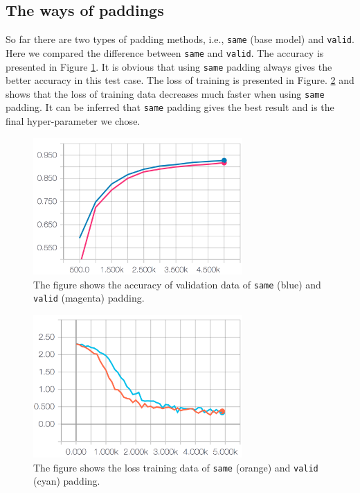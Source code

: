 \documentclass[11pt]{article}
\begin{document}
\clearpage
\subsection{The ways of paddings}
So far there are two types of padding methods, i.e., {\tt same} (base model) and {\tt valid}. Here we compared the difference between {\tt same} and {\tt valid}. The accuracy is presented in Figure \ref{fig:padding}. It is obvious that using {\tt same} padding always gives the better accuracy in this test case. The loss of training is presented in Figure. \ref{fig:padding_loss} and shows that the loss of training data decreases much faster when using {\tt same} padding. It can be inferred that {\tt same} padding gives the best result and is the final hyper-parameter we chose.


\begin{figure}[!htb]
   \centering
   \includegraphics[width=8cm]{images/padding_accuracy.png} %
   \caption{The figure shows the accuracy of validation data of {\tt same} (blue) and {\tt valid} (magenta) padding. }
   \label{fig:padding}
\end{figure}



\begin{figure}[!htb]
   \centering
   \includegraphics[width=8cm]{images/padding_loss.png} %
   \caption{The figure shows the loss training data of {\tt same} (orange) and {\tt valid} (cyan) padding. }
   \label{fig:padding_loss}
\end{figure}
\end{document}
